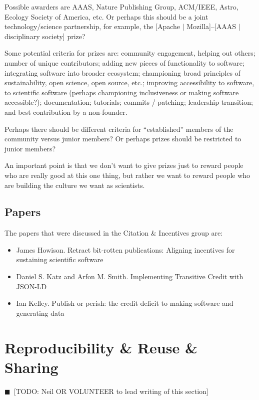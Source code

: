 \documentclass[11pt, oneside]{amsart}
\newcommand{\todo}[1]{{\color{blue}$\blacksquare$~\textsf{[TODO: #1]}}}
\begin{document}
Possible awarders are AAAS, Nature Publishing Group, ACM/IEEE, Astro, Ecology
Society of America, etc. Or perhaps this should be a joint technology/science
partnership, for example, the [Apache $|$ Mozilla]--[AAAS $|$ disciplinary
society] prize?

Some potential criteria for prizes are:
community engagement, helping out others;
number of unique contributors;
adding new pieces of functionality to software;
integrating software into broader ecosystem; championing broad principles of
sustainability, open science, open source, etc.;
improving accessibility to software, to scientific software (perhaps championing
inclusiveness or making software accessible?);
documentation;
tutorials;
commits / patching;
leadership transition; and
best contribution by a non-founder.

Perhaps there should be different criteria for ``established'' members of the
community versus junior members? Or perhaps prizes should be restricted to
junior members?

An important point is that we don't want to give prizes just to reward people
who are really good at this one thing, but rather we want to reward people who
are building the culture we want as scientists.

 



\subsection{Papers}
The papers that were discussed in the Citation \& Incentives group are:
\begin{itemize}
\item James Howison. Retract bit-rotten publications: Aligning incentives for
sustaining scientific software~\cite{wssspe2_howison}

\item Daniel S. Katz and Arfon M. Smith. Implementing Transitive Credit with
{JSON-LD}~\cite{wssspe2_katz}

\item Ian Kelley. Publish or perish: the credit deficit to making software and
generating data~\cite{wssspe2_kelley}
\end{itemize}

\section{Reproducibility \& Reuse \& Sharing} \label{sec:reproduce}
\todo{Neil OR VOLUNTEER to lead writing of this section}
\end{document}
